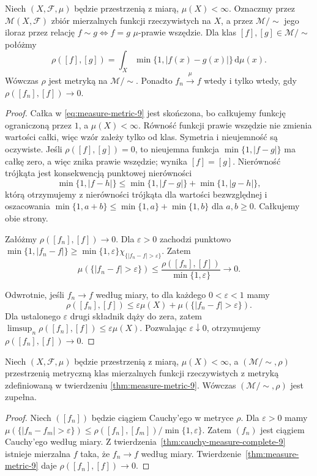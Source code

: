 \begin{twierdzenie}
\label{thm:measure-metric-9}
Niech $(X,\mathcal F,\mu)$ będzie przestrzenią z miarą,
$\mu(X)<\infty$. Oznaczmy przez
$\mathcal M(X,\mathcal F)$ zbiór mierzalnych funkcji
rzeczywistych na $X$, a przez $\mathcal M/\!\sim$
jego iloraz przez relację
$f\sim g\Longleftrightarrow f=g$ $\mu$-prawie wszędzie.
Dla klas $[f],[g]\in\mathcal M/\!\sim$ połóżmy
\begin{equation}\label{eq:measure-metric-9}
\rho([f],[g])=
\int_X\min\{1,|f(x)-g(x)|\}\,\mathrm d\mu(x).
\end{equation}
Wówczas $\rho$ jest metryką na $\mathcal M/\!\sim$.
Ponadto $f_n\xrightarrow{\mu}f$ wtedy i tylko wtedy,
gdy $\rho([f_n],[f])\to0$.
\end{twierdzenie}
\begin{proof}
Całka w \eqref{eq:measure-metric-9} jest skończona,
bo całkujemy funkcję ograniczoną przez $1$,
a $\mu(X)<\infty$. Równość funkcji prawie
wszędzie nie zmienia wartości całki, więc wzór
zależy tylko od klas. Symetria i nieujemność
są oczywiste. Jeśli $\rho([f],[g])=0$, to
nieujemna funkcja $\min\{1,|f-g|\}$ ma całkę
zero, a więc znika prawie wszędzie; wynika
$[f]=[g]$. Nierówność trójkąta jest konsekwencją
punktowej nierówności
\[
\min\{1,|f-h|\}\le
\min\{1,|f-g|\}+\min\{1,|g-h|\},
\]
którą otrzymujemy z nierówności trójkąta dla
wartości bezwzględnej i oszacowania
$\min\{1,a+b\}\le\min\{1,a\}+\min\{1,b\}$
dla $a,b\ge0$. Całkujemy obie strony.

Załóżmy $\rho([f_n],[f])\to0$. Dla $\varepsilon>0$
zachodzi punktowo
$\min\{1,|f_n-f|\}\ge
\min\{1,\varepsilon\}\chi_{\{|f_n-f|>\varepsilon\}}$.
Zatem
\[
\mu(\{|f_n-f|>\varepsilon\})\le
\frac{\rho([f_n],[f])}{\min\{1,\varepsilon\}}
\longrightarrow0.
\]

Odwrotnie, jeśli $f_n\to f$ według miary,
to dla każdego $0<\varepsilon<1$ mamy
\[
\rho([f_n],[f])\le\varepsilon\mu(X)+
\mu(\{|f_n-f|>\varepsilon\}).
\]
Dla ustalonego $\varepsilon$ drugi składnik
dąży do zera, zatem
$\limsup_n\rho([f_n],[f])\le\varepsilon\mu(X)$.
Pozwalając $\varepsilon\downarrow0$, otrzymujemy
$\rho([f_n],[f])\to0$.
\end{proof}

\begin{wniosek}
\label{cor:measure-metric-complete-9}
Niech $(X,\mathcal F,\mu)$ będzie przestrzenią z miarą,
$\mu(X)<\infty$, a $(\mathcal M/\!\sim,\rho)$ przestrzenią
metryczną klas mierzalnych funkcji rzeczywistych z metryką
zdefiniowaną w twierdzeniu \ref{thm:measure-metric-9}.
Wówczas $(\mathcal M/\!\sim,\rho)$ jest zupełna.
\end{wniosek}
\begin{proof}
Niech $([f_n])$ będzie ciągiem Cauchy'ego w metryce
$\rho$. Dla $\varepsilon>0$ mamy
$\mu(\{|f_n-f_m|>\varepsilon\})\le
\rho([f_n],[f_m])/\min\{1,\varepsilon\}$.
Zatem $(f_n)$ jest ciągiem Cauchy'ego według miary.
Z twierdzenia~\ref{thm:cauchy-measure-complete-9}
istnieje mierzalna $f$ taka, że $f_n\to f$
według miary. Twierdzenie~\ref{thm:measure-metric-9}
daje $\rho([f_n],[f])\to0$.
\end{proof}

